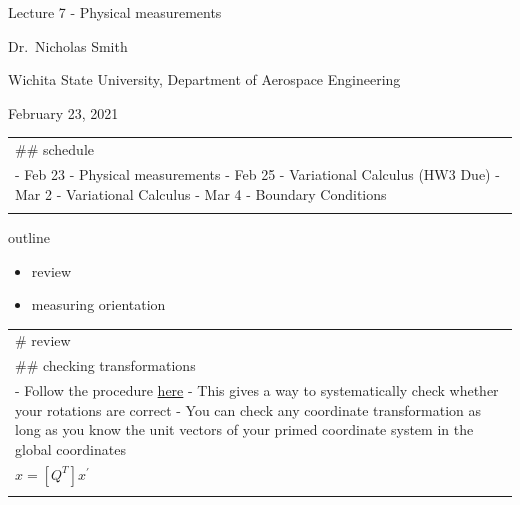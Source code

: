 \documentclass[12pt,handout]{beamer}
\providecommand{\tightlist}{%
  \setlength{\itemsep}{0pt}\setlength{\parskip}{0pt}}
\providecommand{\tightlist}{%
\setlength{\itemsep}{0pt}\setlength{\parskip}{0pt}}
\begin{document}
\begin{frame}
Lecture 7 - Physical measurements

Dr.~Nicholas Smith

Wichita State University, Department of Aerospace Engineering

February 23, 2021

\begin{longtable}[]{@{}
  >{\raggedright\arraybackslash}p{}@{}}
\toprule
\endhead
\#\# schedule \\ \addlinespace
- Feb 23 - Physical measurements - Feb 25 - Variational Calculus (HW3
Due) - Mar 2 - Variational Calculus - Mar 4 - Boundary
Conditions \\ \addlinespace
\bottomrule
\end{longtable}
\end{frame}

\begin{frame}{outline}
\protect\hypertarget{outline}{}
\begin{itemize}
\tightlist
\item
  review
\item
  measuring orientation
\end{itemize}

\begin{longtable}[]{@{}
  >{\raggedright\arraybackslash}p{}@{}}
\toprule
\# review \\ \addlinespace
\midrule
\endhead
\#\# checking transformations \\ \addlinespace
- Follow the procedure
\href{http://nbviewer.jupyter.org/github/ndaman/multiscale/blob/master/examples/Orientation\%20Playground.ipynb}{here}
- This gives a way to systematically check whether your rotations are
correct - You can check any coordinate transformation as long as you
know the unit vectors of your primed coordinate system in the global
coordinates \\ \addlinespace
\(x = [Q^T]x^\prime \) \\ \addlinespace
\bottomrule
\end{longtable}
\end{frame}
\end{document}
